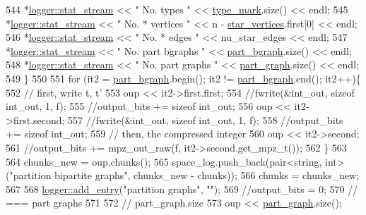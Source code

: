 \begin{DoxyCode}
544     *\hyperlink{classlogger_a7db37821f875f2ba3540980b355779f5}{logger::stat\_stream} << \textcolor{stringliteral}{" No. types         "} << 
      \hyperlink{classmarked__graph__compressed_a86b00223525703e973415cbc9c94da68}{type\_mark}.size() << endl;
545     *\hyperlink{classlogger_a7db37821f875f2ba3540980b355779f5}{logger::stat\_stream} << \textcolor{stringliteral}{" No. * vertices    "} << n - 
      \hyperlink{classmarked__graph__compressed_a7a4ced4586e2e353f9076bd447df5208}{star\_vertices}.first[0] << endl;
546     *\hyperlink{classlogger_a7db37821f875f2ba3540980b355779f5}{logger::stat\_stream} << \textcolor{stringliteral}{" No. * edges       "} << nu\_star\_edges << endl;
547     *\hyperlink{classlogger_a7db37821f875f2ba3540980b355779f5}{logger::stat\_stream} << \textcolor{stringliteral}{" No. part bgraphs  "} << 
      \hyperlink{classmarked__graph__compressed_a7b3267063fba30b45eb21b3ba4e07536}{part\_bgraph}.size() << endl;
548     *\hyperlink{classlogger_a7db37821f875f2ba3540980b355779f5}{logger::stat\_stream} << \textcolor{stringliteral}{" No. part graphs   "} << 
      \hyperlink{classmarked__graph__compressed_ae179a4737e6eab905c18a94d44ef64b7}{part\_graph}.size() << endl;
549   \}
550 
551   \textcolor{keywordflow}{for} (it2 = \hyperlink{classmarked__graph__compressed_a7b3267063fba30b45eb21b3ba4e07536}{part\_bgraph}.begin(); it2 != \hyperlink{classmarked__graph__compressed_a7b3267063fba30b45eb21b3ba4e07536}{part\_bgraph}.end(); it2++)\{
552     \textcolor{comment}{// first, write t, t'}
553     oup << it2->first.first;
554     \textcolor{comment}{//fwrite(&int\_out, sizeof int\_out, 1, f);}
555     \textcolor{comment}{//output\_bits += sizeof int\_out;}
556     oup <<  it2->first.second;
557     \textcolor{comment}{//fwrite(&int\_out, sizeof int\_out, 1, f);}
558     \textcolor{comment}{//output\_bits += sizeof int\_out;}
559     \textcolor{comment}{// then, the compressed integer}
560     oup << it2->second;
561     \textcolor{comment}{//output\_bits += mpz\_out\_raw(f, it2->second.get\_mpz\_t());}
562   \}
563 
564   chunks\_new = oup.chunks();
565   space\_log.push\_back(pair<string, int> (\textcolor{stringliteral}{"partition bipartite graphs"}, chunks\_new - chunks));
566   chunks = chunks\_new;
567 
568   \hyperlink{classlogger_a710163deb17bc81f70d53d285b8ac9ac}{logger::add\_entry}(\textcolor{stringliteral}{"partition graphs"}, \textcolor{stringliteral}{""});
569   \textcolor{comment}{//output\_bits = 0;}
570   \textcolor{comment}{// === part graphs}
571 
572   \textcolor{comment}{// part\_graph.size}
573   oup <<  \hyperlink{classmarked__graph__compressed_ae179a4737e6eab905c18a94d44ef64b7}{part\_graph}.size();

\end{DoxyCode}

